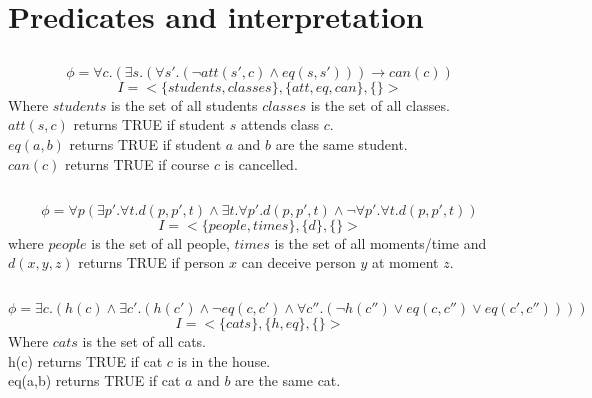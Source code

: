 \documentclass[]{article}
\begin{document}
\section{Predicates and interpretation}
\subsection{}
$$
\phi = \forall c.(\exists s.(\forall s'.(\neg att(s',c)\wedge eq(s,s')))\rightarrow can(c))
$$
$$I = <\{students, classes\},\{att, eq, can\}, \{\}>$$
Where $students$ is the set of all students $classes$ is the set of all classes.\\
$att(s,c)$ returns TRUE if student $s$ attends class $c$.\\
$eq(a,b)$ returns TRUE if student $a$ and $b$ are the same student.\\
$can(c)$ returns TRUE if course $c$ is cancelled.
\subsection{}
$$\phi = \forall p(\exists p'.\forall t.d(p,p',t) \wedge \exists t.\forall p'.d(p,p',t) \wedge \neg\forall p'.\forall t.d(p,p',t))$$
$$I = <\{people, times\}, \{d\}, \{\}>$$
where $people$ is the set of all people, $times$ is the set of all moments/time and $d(x,y,z)$ returns TRUE if person $x$ can deceive person $y$ at moment $z$.
\subsection{}
$$
\phi = \exists c.(h(c)\wedge \exists c'.(h(c') \wedge \neg eq(c,c')\wedge \forall c''.(\neg h(c'')\vee eq(c,c'')\vee eq(c',c''))))
$$
$$
I = <\{cats\},\{h, eq\}, \{\}>
$$
Where $cats$ is the set of all cats.\\
h(c) returns TRUE if cat $c$ is in the house.\\
eq(a,b) returns TRUE if cat $a$ and $b$ are the same cat.
\end{document}
